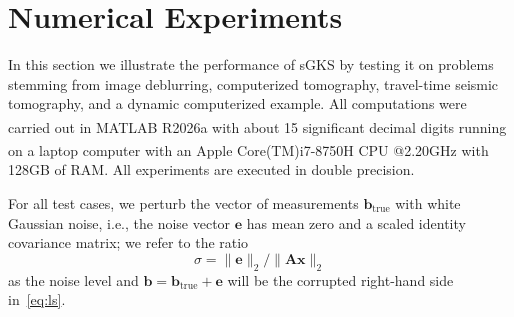 \documentclass[%
  a4paper,
  onecolumn,
  colorlinks,
]{preprint}
\theoremstyle{plain}
\theoremstyle{definition}
\newcommand{\bA}{\ensuremath{\boldsymbol{A}}}
\newcommand{\bb}{\mathbf{b}}
\newcommand{\bx}{\mathbf{x}}
\newcommand{\be}{\mathbf{e}}
\begin{document}
\section{Numerical Experiments}\label{sec:numerics}

In this section we illustrate the performance of sGKS by testing it on problems stemming from image deblurring, computerized tomography, travel-time seismic tomography, and a dynamic computerized example. 
All computations were carried out in MATLAB\textsuperscript{\textregistered} R2026a with about 15 significant decimal digits running on a laptop computer with an 
Apple\textsuperscript{\textregistered} Core(TM)i7-8750H CPU @2.20GHz with 128GB of RAM. All experiments are executed in double precision.

For all test cases, we perturb the vector of measurements $\bb_{\mathrm{true}}$ with white Gaussian noise, i.e., the noise vector $\be$ has mean zero and a scaled identity covariance matrix; 
we refer to the ratio 
\begin{equation}
\sigma=\|\be\|_{2}/\|\bA\bx\|_{2}
\end{equation} as the noise level and $\bb=\bb_{\mathrm{true}}+\be$ will be the corrupted right-hand side in~\eqref{eq:ls}.  
\end{document}
